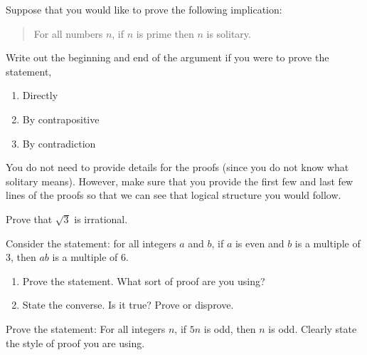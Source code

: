 \documentclass[10pt,]{book}
\theoremstyle{plain}
\theoremstyle{definition}
\theoremstyle{definition}
\theoremstyle{definition}
\theoremstyle{definition}
\numberwithin{equation}{chapter}
\begin{document}
\begin{divisionexercise}{5}\hypertarget{exercise-240}{}
\hypertarget{p-2032}{}%
Suppose that you would like to prove the following implication:%
\begin{quote}\hypertarget{blockquote-16}{}
\hypertarget{p-2033}{}%
For all numbers \(n\), if \(n\) is prime then \(n\) is solitary.%
\end{quote}
\hypertarget{p-2034}{}%
Write out the beginning and end of the argument if you were to prove the statement,%
\par
\hypertarget{p-2035}{}%
\leavevmode%
\begin{enumerate}[label=(\alph*)]
\item\hypertarget{li-705}{}\hypertarget{p-2036}{}%
Directly %
\item\hypertarget{li-706}{}\hypertarget{p-2037}{}%
By contrapositive %
\item\hypertarget{li-707}{}\hypertarget{p-2038}{}%
By contradiction %
\end{enumerate}
%
\par
\hypertarget{p-2039}{}%
You do not need to provide details for the proofs (since you do not know what solitary means). However, make sure that you provide the first few and last few lines of the proofs so that we can see that logical structure you would follow.%
\end{divisionexercise}%
\begin{divisionexercise}{6}\hypertarget{exercise-241}{}
\hypertarget{p-2040}{}%
Prove that \(\sqrt 3\) is irrational.%
\end{divisionexercise}%
\begin{divisionexercise}{7}\hypertarget{exercise-242}{}
\hypertarget{p-2045}{}%
Consider the statement: for all integers \(a\) and \(b\), if \(a\) is even and \(b\) is a multiple of 3, then \(ab\) is a multiple of 6.%
\par
\hypertarget{p-2046}{}%
\leavevmode%
\begin{enumerate}[label=(\alph*)]
\item\hypertarget{li-708}{}\hypertarget{p-2047}{}%
Prove the statement. What sort of proof are you using?%
\item\hypertarget{li-709}{}\hypertarget{p-2048}{}%
State the converse. Is it true? Prove or disprove.%
\end{enumerate}
%
\end{divisionexercise}%
\begin{divisionexercise}{8}\hypertarget{exercise-243}{}
\hypertarget{p-2049}{}%
Prove the statement: For all integers \(n\), if \(5n\) is odd, then \(n\) is odd. Clearly state the style of proof you are using.%
\end{divisionexercise}%
\end{document}
